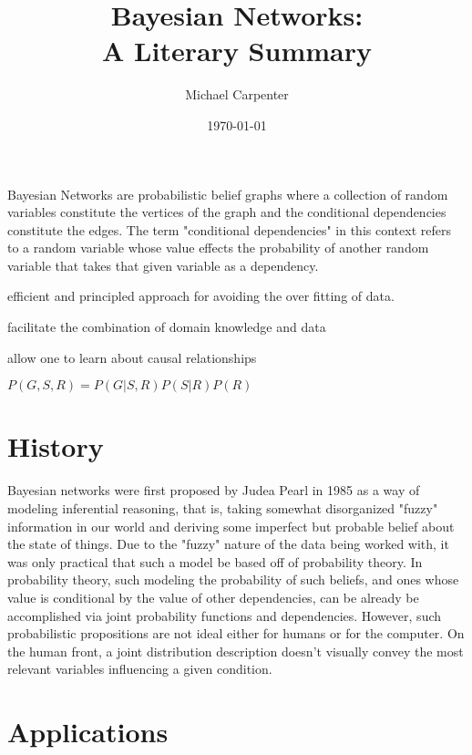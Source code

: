 \documentclass{article}
\title{Bayesian Networks: \\ A Literary Summary}
\author{Michael Carpenter}
\date{\today}
\begin{document}
\maketitle

Bayesian Networks are probabilistic belief graphs where a collection of random variables constitute the vertices of the graph and the conditional dependencies constitute the edges. The term "conditional dependencies" in this context refers to a random variable whose value effects the probability of another random variable that takes that given variable as a dependency. 

efficient and principled approach for avoiding the over fitting of data.

facilitate the combination of domain knowledge and data

allow one to learn about causal relationships

$P(G,S,R)=P(G|S,R)P(S|R)P(R)$

\section{History}

Bayesian networks were first proposed by Judea Pearl in 1985 as a way of modeling inferential reasoning, that is, taking somewhat disorganized "fuzzy" information in our world and deriving some imperfect but probable belief about the state of things. Due to the "fuzzy" nature of the data being worked with, it was only practical that such a model be based off of probability theory. In probability theory, such modeling the probability of such beliefs, and ones whose value is conditional by the value of other dependencies, can be already be accomplished via joint probability functions and dependencies. However, such probabilistic propositions are not ideal either for humans or for the computer. On the human front, a joint distribution description doesn't visually convey the most relevant variables influencing a given condition. 

\cite{murphy02}

\section{Applications}



\end{document}
